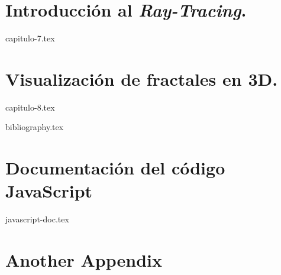 \documentclass[11pt]{report}
\begin{document}
\chapter{Introducción al \textit{Ray-Tracing}.}
\label{chap:ray-tracing}

{capitulo-7.tex}

\chapter{Visualización de fractales en 3D.}
\label{chap:fractales-3D}

{capitulo-8.tex}


{bibliography.tex}



\appendix
\cleardoublepage


\chapter{Documentación del código JavaScript}
\label{appendix:javascript}

{javascript-doc.tex}


\chapter{Another Appendix}
\end{document}
